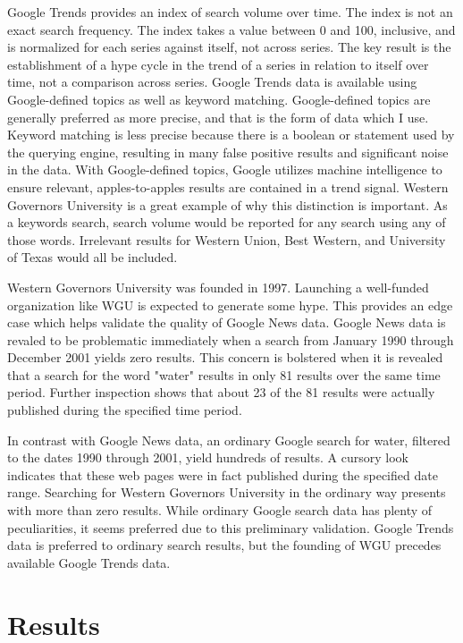 \documentclass[review]{elsarticle}
\begin{document}
    Google Trends provides an index of search volume over time.
    The index is not an exact search frequency.
    The index takes a value between 0 and 100, inclusive, and is normalized for each series against itself, not across series.
    The key result is the establishment of a hype cycle in the trend of a series in relation to itself over time, not a comparison across series.
    Google Trends data is available using Google-defined topics as well as keyword matching.
    Google-defined topics are generally preferred as more precise, and that is the form of data which I use.
    Keyword matching is less precise because there is a boolean or statement used by the querying engine, resulting in many false positive results and significant noise in the data.
    With Google-defined topics, Google utilizes machine intelligence to ensure relevant, apples-to-apples results are contained in a trend signal.
    Western Governors University is a great example of why this distinction is important.
    As a keywords search, search volume would be reported for any search using any of those words.
    Irrelevant results for Western Union, Best Western, and University of Texas would all be included.
    
    Western Governors University was founded in 1997.
    Launching a well-funded organization like WGU is expected to generate some hype.
    This provides an edge case which helps validate the quality of Google News data.
    Google News data is revaled to be problematic immediately when a search from January 1990 through December 2001 yields zero results.
    This concern is bolstered when it is revealed that a search for the word "water" results in only 81 results over the same time period.
    Further inspection shows that about 23 of the 81 results were actually published during the specified time period.
    
    In contrast with Google News data, an ordinary Google search for water, filtered to the dates 1990 through 2001, yield hundreds of results.
    A cursory look indicates that these web pages were in fact published during the specified date range.
    Searching for Western Governors University in the ordinary way presents with more than zero results.
    While ordinary Google search data has plenty of peculiarities, it seems preferred due to this preliminary validation.
    Google Trends data is preferred to ordinary search results, but the founding of WGU precedes available Google Trends data.

    \section{Results}
\end{document}
